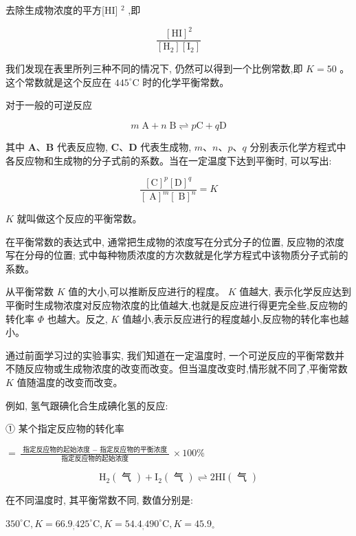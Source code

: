 \documentclass[10pt]{article}
\begin{document}
去除生成物浓度的平方[HI] \({}^{2}\) ,即

\[
\frac{{\left\lbrack \mathrm{{HI}}\right\rbrack }^{2}}{\left\lbrack {\mathrm{H}}_{2}\right\rbrack \left\lbrack {\mathrm{I}}_{2}\right\rbrack }
\]

我们发现在表里所列三种不同的情况下, 仍然可以得到一个比例常数,即 \(K = {50}\) 。这个常数就是这个反应在 \({445}^{ \circ }\mathrm{C}\) 时的化学平衡常数。

对于一般的可逆反应

\[
m\mathrm{\;A} + n\mathrm{\;B} \rightleftharpoons p\mathrm{C} + q\mathrm{D}
\]

其中 \(\mathbf{A}\text{、}\mathbf{B}\) 代表反应物, \(\mathbf{C}\text{、}\mathbf{D}\) 代表生成物, \(m\text{、}n\text{、}p\text{、}q\) 分别表示化学方程式中各反应物和生成物的分子式前的系数。当在一定温度下达到平衡时, 可以写出:

\[
\frac{{\left\lbrack \mathrm{C}\right\rbrack }^{p}{\left\lbrack \mathrm{D}\right\rbrack }^{q}}{{\left\lbrack \mathrm{\;A}\right\rbrack }^{m}{\left\lbrack \mathrm{\;B}\right\rbrack }^{n}} = K
\]

\(K\) 就叫做这个反应的平衡常数。

在平衡常数的表达式中, 通常把生成物的浓度写在分式分子的位置, 反应物的浓度写在分母的位置; 式中每种物质浓度的方次数就是化学方程式中该物质分子式前的系数。

从平衡常数 \(K\) 值的大小,可以推断反应进行的程度。 \(K\) 值越大, 表示化学反应达到平衡时生成物浓度对反应物浓度的比值越大,也就是反应进行得更完全些,反应物的转化率 \(\Phi\) 也越大。反之, \(K\) 值越小,表示反应进行的程度越小,反应物的转化率也越小。

通过前面学习过的实验事实, 我们知道在一定温度时, 一个可逆反应的平衡常数并不随反应物或生成物浓度的改变而改变。但当温度改变时,情形就不同了,平衡常数 \(K\) 值随温度的改变而改变。

例如, 氢气跟碘化合生成碘化氢的反应:

① 某个指定反应物的转化率

\(= \frac{\text{ 指定反应物的起始浓度 } - \text{ 指定反应物的平衡浓度 }}{\text{ 指定反应物的起始浓度 }} \times {100}\%\)

\[
{\mathrm{H}}_{2}\left( \text{ 气 }\right) + {\mathrm{I}}_{2}\left( \text{ 气 }\right) \rightleftharpoons 2\mathrm{{HI}}\left( \text{ 气 }\right)
\]

在不同温度时, 其平衡常数不同, 数值分别是:

\({350}^{ \circ }\mathrm{C},K = {66.9}_{;}{425}^{ \circ }\mathrm{C},K = {54.4}_{;}{490}^{ \circ }\mathrm{C},K = {45.9}_{ \circ }\)
\end{document}

